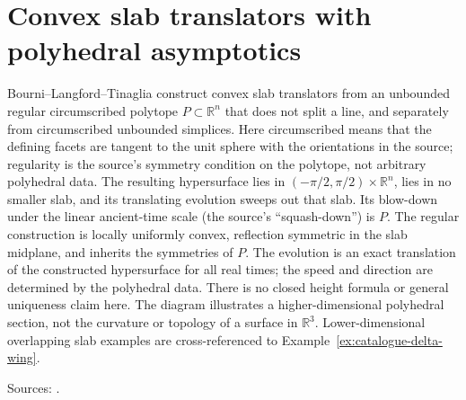 \chapter{Convex slab translators with polyhedral asymptotics}\label{sec:catalogue-polyhedral-slab-translators}
\begin{example}\label{ex:catalogue-polyhedral-slab-translators}
Bourni--Langford--Tinaglia construct convex slab translators from an unbounded regular circumscribed polytope $P\subset\mathbb R^n$ that does not split a line, and separately from circumscribed unbounded simplices. Here circumscribed means that the defining facets are tangent to the unit sphere with the orientations in the source; regularity is the source's symmetry condition on the polytope, not arbitrary polyhedral data. The resulting hypersurface lies in $(-\pi/2,\pi/2)\times\mathbb R^n$, lies in no smaller slab, and its translating evolution sweeps out that slab. Its blow-down under the linear ancient-time scale (the source's ``squash-down'') is $P$. The regular construction is locally uniformly convex, reflection symmetric in the slab midplane, and inherits the symmetries of $P$.
The evolution is an exact translation of the constructed hypersurface for all real times; the speed and direction are determined by the polyhedral data. There is no closed height formula or general uniqueness claim here. The diagram illustrates a higher-dimensional polyhedral section, not the curvature or topology of a surface in $\mathbb R^3$. Lower-dimensional overlapping slab examples are cross-referenced to Example~\ref{ex:catalogue-delta-wing}.
\par Sources: \cite{CatBourniLangfordTinaglia2022}.
\end{example}

